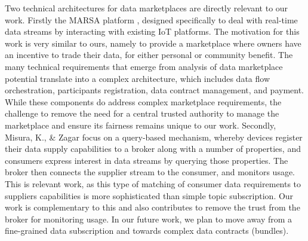 \documentclass[chi_draft]{sigchi}
\begin{document}
{Two technical architectures for data marketplaces are directly relevant to our work.
Firstly the MARSA platform \cite{Cao:2016:MMR:2926746.2883611}, designed specifically to deal with real-time data streams by interacting with existing IoT platforms.
The motivation for this work is very similar to ours, namely to provide a marketplace where owners have an incentive to trade their data, for either personal or community benefit.
The many technical requirements that emerge from analysis of data marketplace potential translate into a complex architecture, which includes data flow orchestration, participants registration, data contract management, and payment.  
While these components do address complex marketplace requirements, the challenge to remove the need for a central trusted authority to manage the marketplace and ensure its fairness remains unique to our work.
Secondly, Misura, K., \& Zagar \cite{7765669} focus on a query-based mechanism, whereby devices register their data supply capabilities to a broker along with a number of properties, and consumers express interest in data streams by querying those properties. The broker then connects the supplier stream to the consumer, and monitors usage. 
This is relevant work, as this type of matching of consumer data requirements to suppliers capabilities is more sophisticated than simple topic subscription. Our work is complementary to this  and also contributes to remove the trust from the broker for monitoring usage.
In our future work, we plan to move away from a fine-grained data subscription and towards complex data contracts (bundles).
%
}
\end{document}
